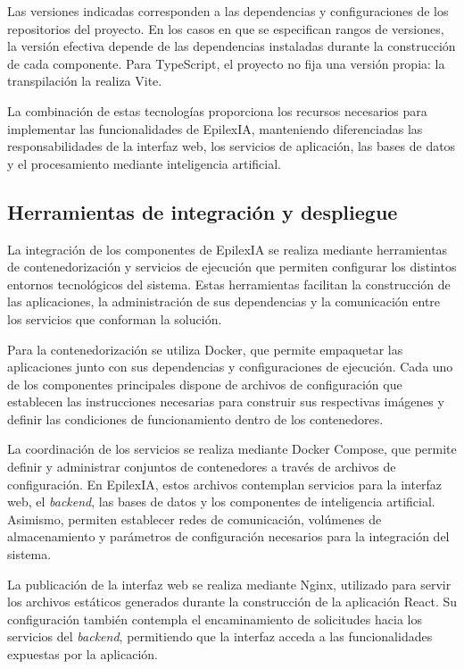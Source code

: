 Las versiones indicadas corresponden a las dependencias y
configuraciones de los repositorios del proyecto.
En los casos en que se especifican rangos de versiones, la
versión efectiva depende de las dependencias instaladas durante
la construcción de cada componente. Para TypeScript, el proyecto no fija una
versión propia: la transpilación la realiza Vite.

La combinación de estas tecnologías proporciona los recursos
necesarios para implementar las funcionalidades de EpilexIA,
manteniendo diferenciadas las responsabilidades de la interfaz
web, los servicios de aplicación, las bases de datos y el
procesamiento mediante inteligencia artificial.


\subsection{Herramientas de integración y despliegue}

La integración de los componentes de EpilexIA se realiza mediante
herramientas de contenedorización y servicios de ejecución que
permiten configurar los distintos entornos tecnológicos del
sistema. Estas herramientas facilitan la construcción de las
aplicaciones, la administración de sus dependencias y la
comunicación entre los servicios que conforman la solución.

Para la contenedorización se utiliza Docker, que permite
empaquetar las aplicaciones junto con sus dependencias y
configuraciones de ejecución. Cada uno de los componentes
principales dispone de archivos de configuración que establecen
las instrucciones necesarias para construir sus respectivas
imágenes y definir las condiciones de funcionamiento dentro
de los contenedores.

La coordinación de los servicios se realiza mediante Docker
Compose, que permite definir y administrar conjuntos de
contenedores a través de archivos de configuración. En EpilexIA,
estos archivos contemplan servicios para la interfaz web, el
\textit{backend}, las bases de datos y los componentes de inteligencia
artificial. Asimismo, permiten establecer redes de comunicación,
volúmenes de almacenamiento y parámetros de configuración
necesarios para la integración del sistema.

La publicación de la interfaz web se realiza mediante Nginx,
utilizado para servir los archivos estáticos generados durante
la construcción de la aplicación React. Su configuración
también contempla el encaminamiento de solicitudes hacia los
servicios del \textit{backend}, permitiendo que la interfaz acceda a
las funcionalidades expuestas por la aplicación.

